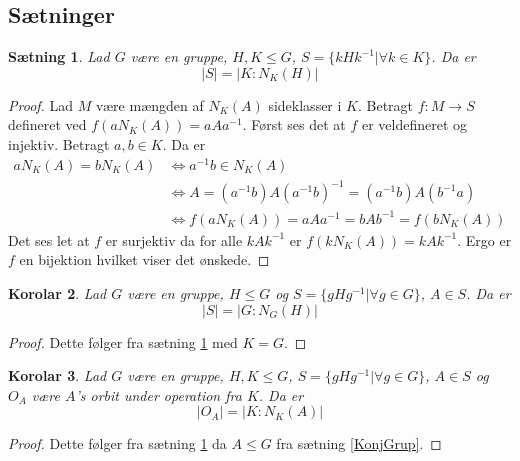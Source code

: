 \documentclass{article}
\newcommand{\inv}{^{-1}}
\newcommand{\biimp}{\Leftrightarrow}
\newcommand{\too}{\rightarrow}
\newtheorem{setn}{Sætning}
\newtheorem{koro}[setn]{Korolar}
\begin{document}
		\subsection*{Sætninger}
		\begin{setn} \label{OrbStø}
			Lad $G$ være en gruppe, $H,K \le G$, $S = \{kHk\inv| \forall k \in K\}$. Da er
			$$|S| = |K:N_K(H)|$$
		\end{setn}
		\begin{proof}
			Lad $M$ være mængden af $N_K(A)$ sideklasser i $K$.
			Betragt $f:M \too S$ defineret ved $f(aN_K(A)) = aAa\inv$.
			Først ses det at $f$ er veldefineret og injektiv. Betragt $a,b \in K$. Da er
			\begin{align*}
				aN_K(A) = bN_K(A) &\biimp a\inv b \in N_K(A) \\
				&\biimp A = (a\inv b)A(a\inv b)\inv = (a\inv b)A(b\inv a) \\
				&\biimp f(aN_K(A)) = aAa\inv = bAb\inv = f(bN_K(A))
			\end{align*}
			Det ses let at $f$ er surjektiv da for alle $kAk\inv$ er $f(kN_K(A)) = kAk\inv$.
			Ergo er $f$ en bijektion hvilket viser det ønskede.
		\end{proof}
		\begin{koro}
			Lad $G$ være en gruppe, $H \le G$ og $S = \{gHg\inv| \forall g \in G\}$, $A \in S$.
			Da er
			$$|S| = |G:N_G(H)|$$
		\end{koro}
		\begin{proof}
			Dette følger fra sætning \ref{OrbStø} med $K = G$.
		\end{proof}
		\begin{koro}
			Lad $G$ være en gruppe, $H,K \le G$, $S = \{gHg\inv| \forall g \in G\}$, $A \in S$
			og $O_A$ være $A$'s orbit under operation fra $K$. Da er
			$$|O_A| = |K:N_K(A)|$$
		\end{koro}
		\begin{proof}
			Dette følger fra sætning \ref{OrbStø} da $A \le G$ fra sætning \ref{KonjGrup}.
		\end{proof}
\end{document}
